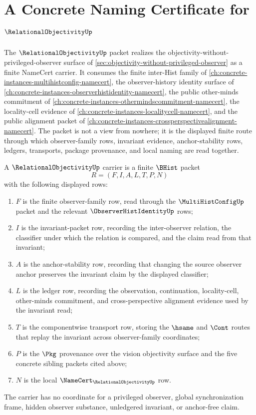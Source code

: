 \chapter{A Concrete Naming Certificate for $\RelationalObjectivityUp$}
\label{ch:concrete-instances-relational-objectivity-namecert}

The $\RelationalObjectivityUp$ packet realizes the objectivity-without-privileged-observer surface of \autoref{sec:objectivity-without-privileged-observer} as a finite NameCert carrier. It consumes the finite inter-Hist family of \autoref{ch:concrete-instances-multihistconfig-namecert}, the observer-history identity surface of \autoref{ch:concrete-instances-observerhistidentity-namecert}, the public other-minds commitment of \autoref{ch:concrete-instances-othermindscommitment-namecert}, the locality-cell evidence of \autoref{ch:concrete-instances-localitycell-namecert}, and the public alignment packet of \autoref{ch:concrete-instances-crossperspectivealignment-namecert}. The packet is not a view from nowhere; it is the displayed finite route through which observer-family rows, invariant evidence, anchor-stability rows, ledgers, transports, package provenance, and local naming are read together.

\begin{definition}
\label{def:relational-objectivity-invariant-packet-carrier}
A $\RelationalObjectivityUp$ carrier is a finite $\BHist$ packet
$$
R=(F,I,A,L,T,P,N)
$$
with the following displayed rows:
\begin{enumerate}
\item $F$ is the finite observer-family row, read through the $\MultiHistConfigUp$ packet and the relevant $\ObserverHistIdentityUp$ rows;
\item $I$ is the invariant-packet row, recording the inter-observer relation, the classifier under which the relation is compared, and the claim read from that invariant;
\item $A$ is the anchor-stability row, recording that changing the source observer anchor preserves the invariant claim by the displayed classifier;
\item $L$ is the ledger row, recording the observation, continuation, locality-cell, other-minds commitment, and cross-perspective alignment evidence used by the invariant read;
\item $T$ is the componentwise transport row, storing the $\hsame$ and $\Cont$ routes that replay the invariant across observer-family coordinates;
\item $P$ is the $\Pkg$ provenance over the vision objectivity surface and the five concrete sibling packets cited above;
\item $N$ is the local $\NameCert_{\RelationalObjectivityUp}$ row.
\end{enumerate}
The carrier has no coordinate for a privileged observer, global synchronization frame, hidden observer substance, unledgered invariant, or anchor-free claim.
\end{definition}

